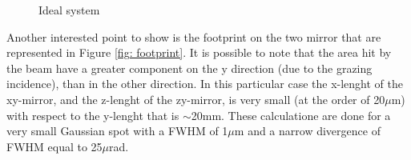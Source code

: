 \begin{figure}[]
%
\centering
%
%
\quad
%
%
%
\caption{Ideal system}
%
\label{fig: ideal}
%
\end{figure}
%
Another interested point to show is the footprint on the two mirror that are represented in Figure \ref{fig: footprint}. It is possible to note that the area hit by the beam have a greater component on the y direction (due to the grazing incidence), than in the other direction. In this particular case the x-lenght of the xy-mirror, and the z-lenght of the zy-mirror, is very small (at the order of 20$\mu $m) with respect to the y-lenght that is $\sim $20mm. These calculatione are done for a very small Gaussian spot with a FWHM of 1$\mu $m and a narrow divergence of FWHM equal to 25$\mu $rad.
